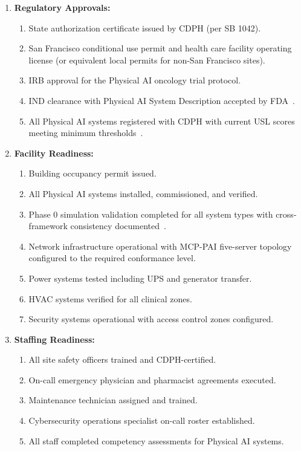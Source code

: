 \documentclass[11pt,letterpaper]{article}
\begin{document}
\begin{enumerate}[label=(\alph*)]
\item \textbf{Regulatory Approvals:}
  \begin{enumerate}[label=(\arabic*)]
  \item State authorization certificate issued by CDPH (per SB 1042).
  \item San Francisco conditional use permit and health care facility operating
    license (or equivalent local permits for non-San Francisco sites).
  \item IRB approval for the Physical AI oncology trial protocol.
  \item IND clearance with Physical AI System Description accepted by
    FDA~\cite{cfr312adapt}.
  \item All Physical AI systems registered with CDPH with current USL scores
    meeting minimum thresholds~\cite{usl2026}.
  \end{enumerate}

\item \textbf{Facility Readiness:}
  \begin{enumerate}[label=(\arabic*)]
  \item Building occupancy permit issued.
  \item All Physical AI systems installed, commissioned, and verified.
  \item Phase 0 simulation validation completed for all system types with
    cross-framework consistency documented~\cite{iche6r3adapt}.
  \item Network infrastructure operational with MCP-PAI five-server topology
    configured to the required conformance level.
  \item Power systems tested including UPS and generator transfer.
  \item HVAC systems verified for all clinical zones.
  \item Security systems operational with access control zones configured.
  \end{enumerate}

\item \textbf{Staffing Readiness:}
  \begin{enumerate}[label=(\arabic*)]
  \item All site safety officers trained and CDPH-certified.
  \item On-call emergency physician and pharmacist agreements executed.
  \item Maintenance technician assigned and trained.
  \item Cybersecurity operations specialist on-call roster established.
  \item All staff completed competency assessments for Physical AI systems.
  \end{enumerate}


\end{enumerate}
\end{document}
